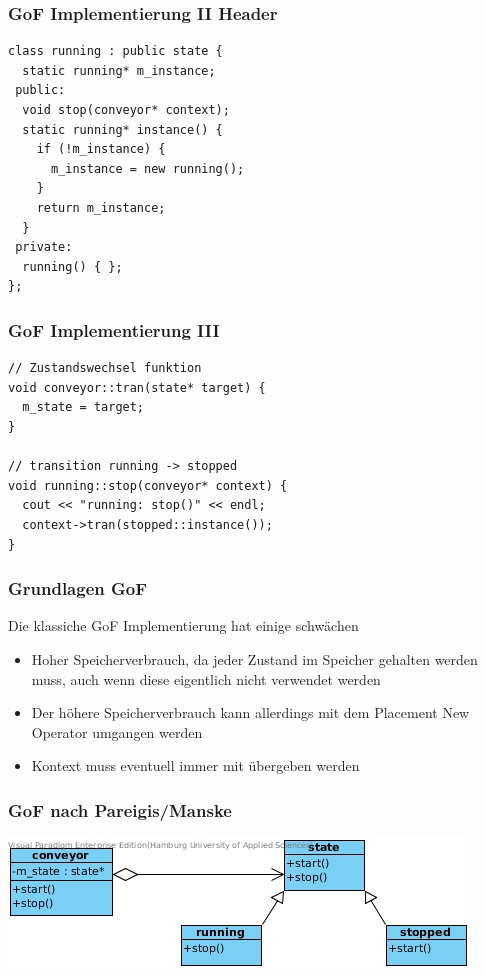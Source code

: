 \documentclass{beamer}
\begin{document}
\begin{frame}[fragile]
 \frametitle{GoF Implementierung II Header}
 \begin{lstlisting}
class running : public state {
  static running* m_instance;
 public:
  void stop(conveyor* context);
  static running* instance() {
    if (!m_instance) {
      m_instance = new running();
    }
    return m_instance;
  }
 private:
  running() { };
};
 \end{lstlisting}
\end{frame}

\begin{frame}[fragile]
 \frametitle{GoF Implementierung III}
 \begin{lstlisting}
// Zustandswechsel funktion
void conveyor::tran(state* target) {
  m_state = target;
}

// transition running -> stopped
void running::stop(conveyor* context) {
  cout << "running: stop()" << endl;
  context->tran(stopped::instance());
}
 \end{lstlisting}
\end{frame}


\begin{frame}
 \frametitle{Grundlagen GoF}
 Die klassiche GoF Implementierung hat einige schw\"achen
 \begin{itemize}
  \item Hoher Speicherverbrauch, da jeder Zustand im Speicher gehalten werden muss, auch wenn diese eigentlich nicht verwendet werden
  \item Der h\"ohere Speicherverbrauch kann allerdings mit dem Placement New Operator umgangen werden
  \item Kontext muss eventuell immer mit \"ubergeben werden
 \end{itemize}
\end{frame}

\begin{frame}
 \frametitle{GoF nach Pareigis/Manske}
 \includegraphics[scale=.6]{img/fsm_gof.jpg}
\end{frame}
\end{document}
